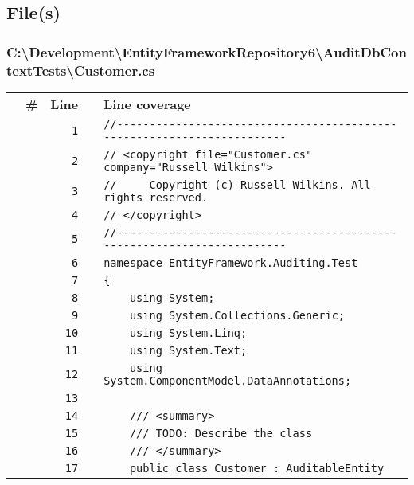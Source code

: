 \documentclass[a4paper,10pt]{article}
\begin{document}
\subsection{File(s)}
\subsubsection{C:\textbackslash Development\textbackslash EntityFrameworkRepository6\textbackslash AuditDbContextTests\textbackslash Customer.cs}
\begin{longtable}[l]{lrrll}
\textbf{} & \textbf{\#} & \textbf{Line} & \textbf{} & \textbf{Line coverage}\\
\cellcolor{gray} &  & \verb~1~ & & \verb~//-----------------------------------------------------------------------~\\
\cellcolor{gray} &  & \verb~2~ & & \verb~// <copyright file="Customer.cs" company="Russell Wilkins">~\\
\cellcolor{gray} &  & \verb~3~ & & \verb~//     Copyright (c) Russell Wilkins. All rights reserved.~\\
\cellcolor{gray} &  & \verb~4~ & & \verb~// </copyright>~\\
\cellcolor{gray} &  & \verb~5~ & & \verb~//-----------------------------------------------------------------------~\\
\cellcolor{gray} &  & \verb~6~ & & \verb~namespace EntityFramework.Auditing.Test~\\
\cellcolor{gray} &  & \verb~7~ & & \verb~{~\\
\cellcolor{gray} &  & \verb~8~ & & \verb~    using System;~\\
\cellcolor{gray} &  & \verb~9~ & & \verb~    using System.Collections.Generic;~\\
\cellcolor{gray} &  & \verb~10~ & & \verb~    using System.Linq;~\\
\cellcolor{gray} &  & \verb~11~ & & \verb~    using System.Text;~\\
\cellcolor{gray} &  & \verb~12~ & & \verb~    using System.ComponentModel.DataAnnotations;~\\
\cellcolor{gray} &  & \verb~13~ & & \verb~~\\
\cellcolor{gray} &  & \verb~14~ & & \verb~    /// <summary>~\\
\cellcolor{gray} &  & \verb~15~ & & \verb~    /// TODO: Describe the class~\\
\cellcolor{gray} &  & \verb~16~ & & \verb~    /// </summary>~\\
\cellcolor{gray} &  & \verb~17~ & & \verb~    public class Customer : AuditableEntity~\\

\end{longtable}
\end{document}
